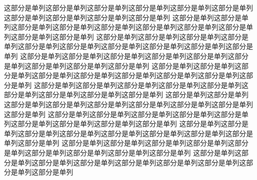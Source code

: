 \documentclass[twocolumn]{ctexart}
\begin{document}
\lipsum[1-3]

\begin{strip}

    这部分是单列这部分是单列这部分是单列这部分是单列这部分是单列这部分是单列这部分是单列这部分是单列这部分是单列这部分是单列
这部分是单列这部分是单列这部分是单列这部分是单列这部分是单列这部分是单列这部分是单列这部分是单列这部分是单列这部分是单列
这部分是单列这部分是单列这部分是单列这部分是单列这部分是单列这部分是单列这部分是单列这部分是单列这部分是单列这部分是单列
这部分是单列这部分是单列这部分是单列这部分是单列这部分是单列这部分是单列这部分是单列这部分是单列这部分是单列
这部分是单列这部分是单列这部分是单列这部分是单列这部分是单列这部分是单列这部分是单列这部分是单列这部分是单列
这部分是单列这部分是单列这部分是单列这部分是单列这部分是单列这部分是单列这部分是单列这部分是单列这部分是单列
这部分是单列这部分是单列这部分是单列这部分是单列这部分是单列这部分是单列这部分是单列这部分是单列这部分是单列
这部分是单列这部分是单列这部分是单列这部分是单列这部分是单列这部分是单列这部分是单列这部分是单列这部分是单列
这部分是单列这部分是单列这部分是单列这部分是单列这部分是单列这部分是单列这部分是单列这部分是单列这部分是单列
这部分是单列这部分是单列这部分是单列这部分是单列这部分是单列这部分是单列这部分是单列这部分是单列这部分是单列
这部分是单列这部分是单列这部分是单列这部分是单列这部分是单列这部分是单列这部分是单列这部分是单列这部分是单列
\end{strip}

\lipsum[7-9]
\end{document}
